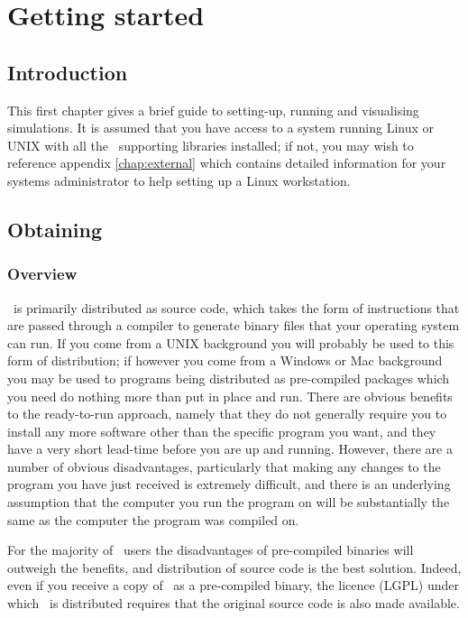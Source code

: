\chapter{Getting started}\label{chap:gettingstarted}

\section{Introduction} This first chapter gives a brief guide to setting-up,
running and visualising simulations. It is assumed that you have access to a
system running Linux or UNIX with all the \fluidity\ supporting libraries
installed; if not, you may wish to reference appendix \ref{chap:external} which
contains detailed information for your systems administrator to help setting up
a Linux workstation. 

\section{Obtaining \fluidity}
\label{sec:obtaining_fluidity}

\subsection{Overview}
\label{sec:obtaining_fluidity_overview}

\fluidity\ is primarily distributed as source code, which takes the form of
instructions that are passed through a compiler to generate binary files that
your operating system can run. If you come from a UNIX background you will
probably be used to this form of distribution; if however you come from a
Windows or Mac background you may be used to programs being distributed as
pre-compiled packages which you need do nothing more than put in place and run.
There are obvious benefits to the ready-to-run approach, namely that they do
not generally require you to install any more software other than the specific
program you want, and they have a very short lead-time before you are up and
running. However, there are a number of obvious disadvantages, particularly that
making any changes to the program you have just received is extremely
difficult, and there is an underlying assumption that the computer you run the
program on will be substantially the same as the computer the program was
compiled on.

For the majority of \fluidity\ users the disadvantages of pre-compiled binaries
will outweigh the benefits, and distribution of source code is the best
solution. Indeed, even if you receive a copy of \fluidity\ as a pre-compiled
binary, the licence (LGPL) under which \fluidity\ is distributed requires that
the original source code is also made available.

